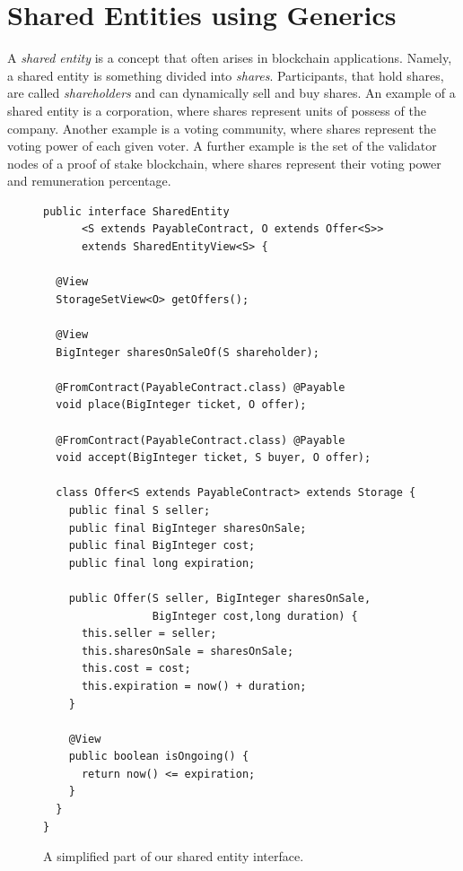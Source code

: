 \section{Shared Entities using Generics}\label{sec:shared_entities}

A \emph{shared entity} is a concept that often arises in blockchain
applications. Namely, a shared entity is something divided into \emph{shares}. Participants,
that hold shares, are called \emph{shareholders} and can dynamically
sell and buy shares. An example of a shared entity is a corporation,
where shares represent units of possess of the company. Another example is
a voting community, where shares represent the voting power of each given voter.
A further example is the set of the validator nodes of a proof of stake blockchain,
where shares represent their voting power and remuneration percentage.

\begin{figure}[ht]
  \begin{center}
    \begin{lstlisting}[language=Takamaka]
public interface SharedEntity
      <S extends PayableContract, O extends Offer<S>>
      extends SharedEntityView<S> {

  @View
  StorageSetView<O> getOffers();

  @View
  BigInteger sharesOnSaleOf(S shareholder);

  @FromContract(PayableContract.class) @Payable
  void place(BigInteger ticket, O offer);

  @FromContract(PayableContract.class) @Payable
  void accept(BigInteger ticket, S buyer, O offer);

  class Offer<S extends PayableContract> extends Storage {
    public final S seller;
    public final BigInteger sharesOnSale;
    public final BigInteger cost;
    public final long expiration;

    public Offer(S seller, BigInteger sharesOnSale, 
                 BigInteger cost,long duration) {
      this.seller = seller;
      this.sharesOnSale = sharesOnSale;
      this.cost = cost;
      this.expiration = now() + duration;
    }

    @View
    public boolean isOngoing() {
      return now() <= expiration;
    }
  }
}
    \end{lstlisting}
  \end{center}
  \caption{A simplified part of our shared entity interface.}\label{fig:shared_entity}
\end{figure}

